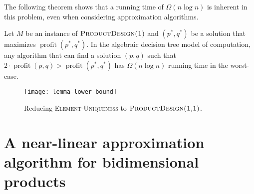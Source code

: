 \documentclass{llncs}
\newcommand{\val}{\operatorname{profit}}
\begin{document}
The following theorem shows that a running time of $\Omega(n\log n)$
is inherent in this problem, even when considering approximation
algorithms.

\begin{thm}
  Let $M$ be an instance of $\textsc{ProductDesign(1)}$ and $(p^*,q^*)$
  be a solution that maximizes $\val(p^*,q^*)$.  In the algebraic decision
  tree model of computation, any algorithm that can find a solution
  $(p,q)$ such that $2\cdot\val(p,q) > \val(p^*,q^*)$ has $\Omega(n\log n)$
  running time in the worst-case.
\end{thm}


\begin{figure}
  \begin{center}
    \texttt{[image: lemma-lower-bound]}
  \end{center}
  \caption{Reducing \textsc{Element-Uniqueness} to
           $\textsc{ProductDesign(1,1)}$.}
\end{figure}

\section{A near-linear approximation algorithm for bidimensional products}
\end{document}
